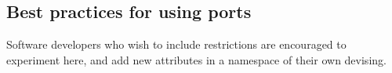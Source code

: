 

\subsection{Best practices for using ports}
\label{best-practices-ports}

Software developers who wish to include restrictions are encouraged to
experiment here, and add new attributes in a namespace of their own
devising.






